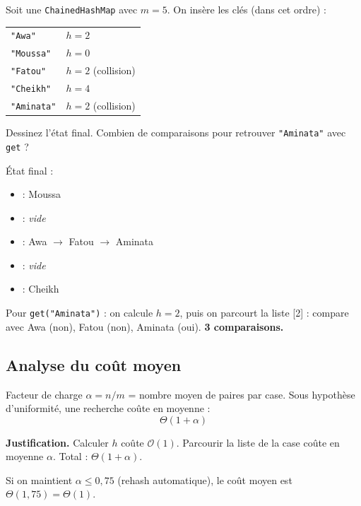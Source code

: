 \documentclass[11pt,a4paper]{article}
\newcommand{\bigO}{\mathcal{O}}
\begin{document}
\begin{appliboxQ}
Soit une \texttt{ChainedHashMap} avec $m = 5$. On insère les clés (dans cet ordre) :

\medskip
\begin{tabular}{@{}ll@{}}
\texttt{"Awa"}     & $h = 2$ \\
\texttt{"Moussa"}  & $h = 0$ \\
\texttt{"Fatou"}   & $h = 2$ (collision) \\
\texttt{"Cheikh"}  & $h = 4$ \\
\texttt{"Aminata"} & $h = 2$ (collision) \\
\end{tabular}

\medskip
Dessinez l'état final. Combien de comparaisons pour retrouver \texttt{"Aminata"} avec \texttt{get} ?
\end{appliboxQ}

\begin{appliboxR}[Réponse]
État final :
\begin{itemize}[nosep]
    \item [0] : Moussa
    \item [1] : \emph{vide}
    \item [2] : Awa $\to$ Fatou $\to$ Aminata
    \item [3] : \emph{vide}
    \item [4] : Cheikh
\end{itemize}

\medskip
Pour \texttt{get("Aminata")} : on calcule $h = 2$, puis on parcourt la liste [2] : compare avec Awa (non), Fatou (non), Aminata (oui). \textbf{3 comparaisons.}
\end{appliboxR}

\subsection{Analyse du coût moyen}

\begin{theorembox}
Facteur de charge $\alpha = n/m$ = nombre moyen de paires par case. Sous hypothèse d'uniformité, une recherche coûte en moyenne :
\[
\boxed{\Theta(1 + \alpha)}
\]
\end{theorembox}

\textbf{Justification.} Calculer $h$ coûte $\bigO(1)$. Parcourir la liste de la case coûte en moyenne $\alpha$. Total : $\Theta(1 + \alpha)$.

\begin{retenirbox}
Si on maintient $\alpha \leq 0{,}75$ (rehash automatique), le coût moyen est $\Theta(1{,}75) = \Theta(1)$.
\end{retenirbox}
\end{document}
